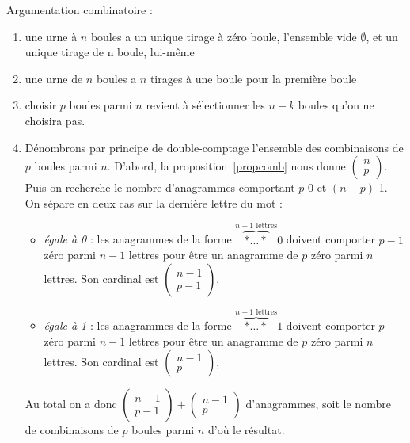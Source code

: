 \documentclass{book}
\begin{document}
\begin{Demonstration}
Argumentation combinatoire :
\begin{enumerate}
\item une urne à $n$ boules a un unique tirage à zéro boule, l'ensemble vide $\emptyset$, et un unique tirage de n boule, lui-même
\item une urne de $n$ boules a $n$ tirages à une boule pour la première boule
\item choisir $p$ boules parmi $n$ revient à sélectionner les $n - k$ boules qu'on ne choisira pas.
\item Dénombrons par principe de double-comptage l'ensemble des combinaisons de $p$ boules parmi $n$. D'abord, la proposition~\ref{propcomb} nous donne $\begin{pmatrix}n\\p\end{pmatrix}$.\\
Puis on recherche le nombre d'anagrammes comportant $p$ 0 et $(n-p)$ 1. On sépare en deux cas sur la dernière lettre du mot :
\begin{itemize}
\item \textit{égale à 0} : les anagrammes de la forme $\overbrace{*\dots*}^{n-1 \text{ lettres}}0$ doivent comporter $p-1$ zéro parmi $n-1$ lettres pour être un anagramme de  $p$ zéro parmi $n$ lettres. Son cardinal est   $\begin{pmatrix}n-1\\p-1\end{pmatrix}$,
\item \textit{égale à 1} : les anagrammes de la forme $\overbrace{*\dots*}^{n-1 \text{ lettres}}1$ doivent comporter $p$ zéro parmi $n-1$ lettres pour être un anagramme de  $p$ zéro parmi $n$ lettres. Son cardinal est   $\begin{pmatrix}n-1\\p\end{pmatrix}$,
\end{itemize}   
Au total on a donc $\begin{pmatrix}n-1\\p-1\end{pmatrix}+\begin{pmatrix}n-1\\p\end{pmatrix}$ d'anagrammes, soit le nombre 
de combinaisons de $p$ boules parmi $n$ d'où le résultat.\\

\end{enumerate}
\end{Demonstration}
\end{document}
